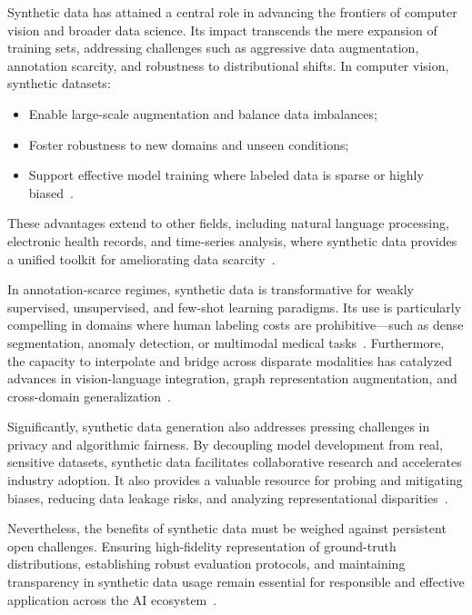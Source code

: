 \documentclass[11pt]{article}
\begin{document}
Synthetic data has attained a central role in advancing the frontiers of computer vision and broader data science. Its impact transcends the mere expansion of training sets, addressing challenges such as aggressive data augmentation, annotation scarcity, and robustness to distributional shifts. In computer vision, synthetic datasets:
\begin{itemize}
    \item Enable large-scale augmentation and balance data imbalances;
    \item Foster robustness to new domains and unseen conditions;
    \item Support effective model training where labeled data is sparse or highly biased~\cite{5,6,10,13,14,15,16,17,18,19,21,22,24,25,26,27,28,30,31,32,34,41,43,45,51,52,53,54,55,59,61,62,63,64,65,74,75,81,82,89,90}.
\end{itemize}
These advantages extend to other fields, including natural language processing, electronic health records, and time-series analysis, where synthetic data provides a unified toolkit for ameliorating data scarcity~\cite{13,62,63,64,81}.

In annotation-scarce regimes, synthetic data is transformative for weakly supervised, unsupervised, and few-shot learning paradigms. Its use is particularly compelling in domains where human labeling costs are prohibitive—such as dense segmentation, anomaly detection, or multimodal medical tasks~\cite{12,23,24,26,31,32,51,53,54,55,59,74,81}. Furthermore, the capacity to interpolate and bridge across disparate modalities has catalyzed advances in vision-language integration, graph representation augmentation, and cross-domain generalization~\cite{14,18,64,81,89,90}.

Significantly, synthetic data generation also addresses pressing challenges in privacy and algorithmic fairness. By decoupling model development from real, sensitive datasets, synthetic data facilitates collaborative research and accelerates industry adoption. It also provides a valuable resource for probing and mitigating biases, reducing data leakage risks, and analyzing representational disparities~\cite{43,51,52,62,87,88}.

Nevertheless, the benefits of synthetic data must be weighed against persistent open challenges. Ensuring high-fidelity representation of ground-truth distributions, establishing robust evaluation protocols, and maintaining transparency in synthetic data usage remain essential for responsible and effective application across the AI ecosystem~\cite{13,62,63,87,88}.
\end{document}
